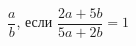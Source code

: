 \begin{ex}[type=calculate_expression]
	\begin{condition}
		\( \dfrac{a}{b} \), если \( \dfrac{2a+5b}{5a+2b}=1 \)
	\end{condition}
\end{ex}